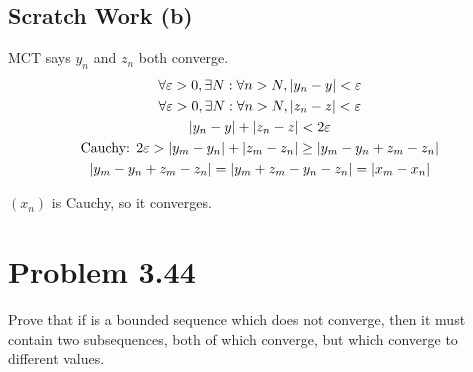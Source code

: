 \documentclass[12pt]{report}
\begin{document}
    \subsection*{Scratch Work (b)}
        MCT says $y_n$ and $z_n$ both converge.
        \begin{gather*}
            \forall \varepsilon > 0, \exists N : \forall n > N, \left| y_n - y \right| < \varepsilon\\
            \forall \varepsilon > 0, \exists N : \forall n > N, \left| z_n - z \right| < \varepsilon\\
            \left| y_n - y \right| + \left| z_n - z \right| < 2\varepsilon\\
            \text{Cauchy: } 2\varepsilon > \left| y_m - y_n \right| + \left| z_m - z_n \right| \geq \left| y_m - y_n + z_m - z_n \right|\\
            \left| y_m - y_n + z_m - z_n \right| = \left| y_m + z_m - y_n - z_n \right|
                =   \left| x_m - x_n \right|
        \end{gather*}

        $(x_n)$ is Cauchy, so it converges.
\pagebreak

\section{Problem 3.44}
    Prove that if  is a bounded sequence which does not converge, then it must contain two subsequences, both of which converge, but which converge to different values. 
\end{document}
